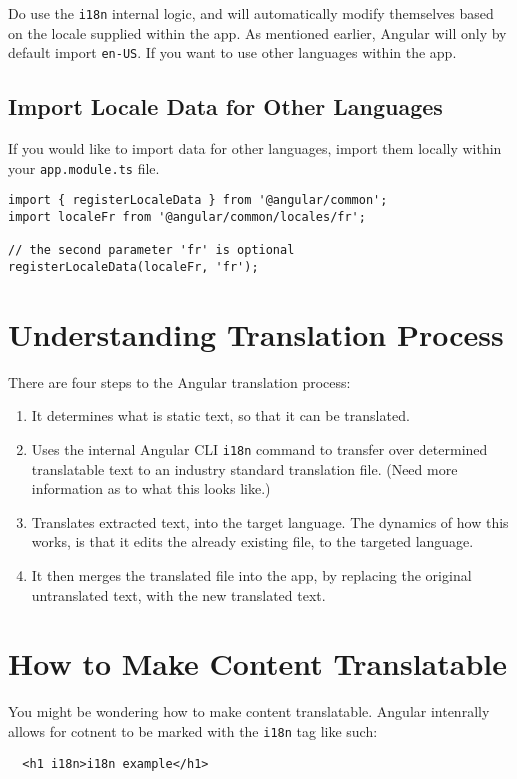 Do use the \lstinline{i18n} internal logic, and will automatically modify 
themselves based on the locale supplied within the app. As mentioned earlier,
Angular will only by default import \lstinline{en-US}. If you want to use other
languages within the app. 

\subsection{Import Locale Data for Other Languages}
If you would like to import data for other languages, import them locally 
within your \lstinline{app.module.ts} file. 

\begin{lstlisting}[caption=app.module.ts]
import { registerLocaleData } from '@angular/common';
import localeFr from '@angular/common/locales/fr';

// the second parameter 'fr' is optional
registerLocaleData(localeFr, 'fr');
\end{lstlisting}

\section{ Understanding Translation Process }
There are four steps to the Angular translation process: 
\begin{enumerate}
  \item It determines what is static text, so that it can be translated.
  \item Uses the internal Angular CLI \lstinline{i18n} command to transfer over 
  determined translatable text to an industry standard translation file. (Need 
  more information as to what this looks like.)
  \item Translates extracted text, into the target language. The dynamics of
  how this works, is that it edits the already existing file, to the targeted 
  language. 
  \item It then merges the translated file into the app, by replacing the 
  original untranslated text, with the new translated text. 
\end{enumerate}

\section{How to Make Content Translatable}
You might be wondering how to make content translatable. Angular intenrally 
allows for cotnent to be marked with the \lstinline{i18n} tag like such: 
\begin{lstlisting}
  <h1 i18n>i18n example</h1>
\end{lstlisting}

